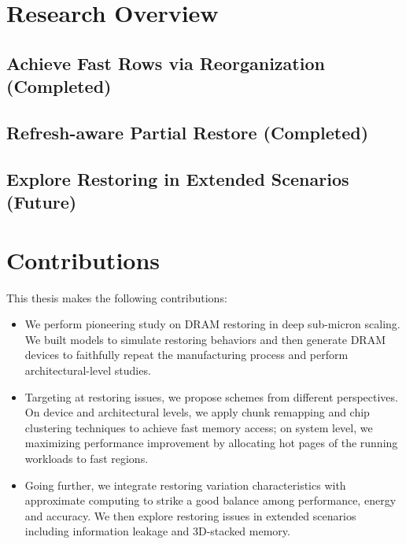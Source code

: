 \section{Research Overview}

\subsection{Achieve Fast Rows via Reorganization (Completed)}

\subsection{Refresh-aware Partial Restore (Completed)}

\subsection{Explore Restoring in Extended Scenarios (Future)}


\section{Contributions}
This thesis makes the following contributions:

\begin{itemize}
\item We perform pioneering study on DRAM restoring in deep sub-micron scaling. We built models to simulate restoring behaviors and then generate DRAM devices to faithfully repeat the manufacturing process  and perform architectural-level studies.
\item Targeting at restoring issues, we propose schemes from different perspectives. On device and architectural levels, we apply chunk remapping and chip clustering techniques to achieve fast memory access; on system level, we maximizing performance improvement by allocating hot pages of the running workloads to fast regions.
\item Going further, we integrate restoring variation characteristics with approximate computing to strike a good balance among performance, energy and accuracy. We then explore restoring issues in extended scenarios including information leakage and 3D-stacked memory.  
\end{itemize}



